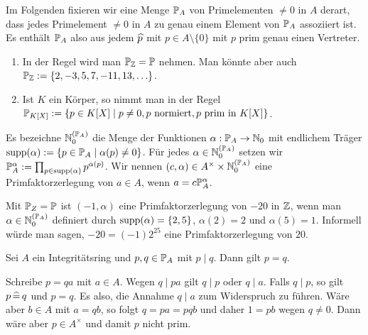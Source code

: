 \documentclass[../../main.tex]{subfiles}
\begin{document}
\begin{nt}\label{16.4.8}
Im Folgenden fixieren wir eine Menge $\P_A$ von Primelementen $\neq 0$ in $A$ derart, dass jedes Primelement $\neq 0$ in $A$ zu genau einem Element von $\P_A$ assoziiert ist. Es enthält $\P_A$ also aus jedem $\tc p$ mit $p\in A\setminus\{0\}$ mit $p$ prim genau einen Vertreter.
\end{nt}

\begin{bsp}\label{14.4.9}
\begin{enumerate}[\normalfont(a)]
\item In der Regel wird man $\P_\Z=\P$ nehmen. Man könnte aber auch $\P_\Z:=\{2,-3,5,7,-11,13,\ldots \}$.
\item Ist $K$ ein Körper, so nimmt man in der Regel\\
$\P_{K[X]}:=\{p\in K[X]\mid p\neq 0, p\text{ normiert},p\text{ prim in }K[X]\}$.
\end{enumerate}
\end{bsp}

\begin{df}\label{14.4.10}
Es bezeichne $\N_0^{(\P_A)}$ die Menge der Funktionen $\alpha: \P_A\to \N_0$ mit endlichem Träger $\supp(\alpha):=\{p\in \P_A\mid \alpha(p)\neq 0\}$. Für jedes $\alpha\in\N_0^{(\P_A)}$ setzen wir $\P_A ^\alpha:=\prod_{p\in\supp(\alpha)}p^{\alpha(p)}$. Wir nennen $(c,\alpha)\in A^\times\times \N_0^{(\P_A)}$ eine Primfaktorzerlegung von $a\in A$, wenn $a=c\P_A^\alpha$.
\end{df}

\begin{bsp}\label{14.4.11}
Mit $\P_Z=\P$ ist $(-1,\alpha)$ eine Primfaktorzerlegung von $-20$ in $\Z$, wenn man $\alpha\in \N_0^{(\P_A)}$ definiert durch $\supp(\alpha)=\{2,5\}$, $\alpha(2)=2$ und $\alpha(5)=1$. Informell würde man sagen, $-20=(-1)2^25$ eine Primfaktorzerlegung von $20$.
\end{bsp}

\begin{lem}\label{16.4.12}
Sei $A$ ein Integritätsring und $p,q\in \P_A$ mit $p\mid q$. Dann gilt $p=q$.
\end{lem}
\begin{cproof}
Schreibe $p=qa$ mit $a\in A$. Wegen $q\mid pa$ gilt $q\mid p$ oder $q\mid a$. Falls $q\mid p$, so gilt $p\divi q$ und $p=q$. Es also, die Annahme $q\mid a$ zum Widerspruch zu führen.  Wäre aber $b\in A$ mit $a=qb$, so folgt $q=pa=pqb$ und daher $1=pb$ wegen $q\neq 0$. Dann wäre aber $p\in A^\times$ und damit $p$ nicht prim.
\end{cproof}
\end{document}
